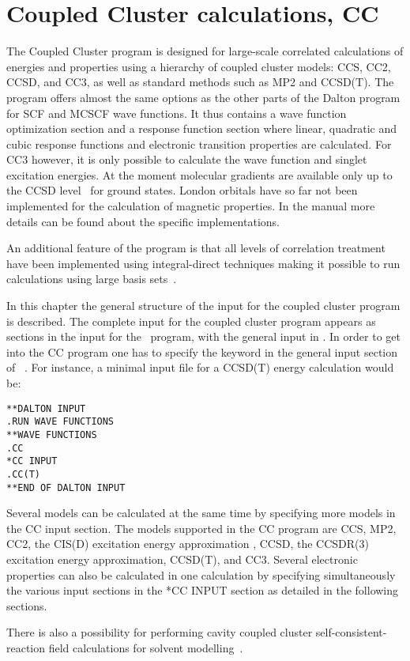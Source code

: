 \chapter{Coupled Cluster calculations, CC}\label{ch:CC}

The Coupled Cluster program {\cc} is designed for large-scale
correlated calculations of energies and properties using a
hierarchy of coupled cluster models: CCS, CC2, CCSD, and CC3, as well as standard methods such as MP2 and CCSD(T).
The program offers almost the same options as the other
parts of the Dalton program for SCF and MCSCF wave functions.
It thus contains a wave function optimization section and 
a response function section
where linear, quadratic and cubic response functions and electronic
transition properties are calculated.
For CC3 however, it is only possible to calculate the wave function and 
singlet excitation energies.
At the moment molecular gradients are available 
only up to the CCSD level~\cite{} for ground states.  
London orbitals have so far not been implemented 
for the calculation of magnetic
properties.
In the manual more details can be found about the specific implementations.

An additional feature of the program is that all levels of correlation
treatment have been implemented using integral-direct techniques making
it possible to run calculations using large basis
sets~\cite{}.

In this chapter the general structure of the input for the
coupled cluster program is described.
The complete input for the coupled cluster program appears as
sections in the input for the \sir\ program, with the general
input in . In order to get into the CC program
one has to specify the  keyword in the general input
section of \sir\ . For instance, a minimal
input file for a CCSD(T) energy calculation would be:
\begin{verbatim}
**DALTON INPUT
.RUN WAVE FUNCTIONS
**WAVE FUNCTIONS
.CC
*CC INPUT
.CC(T)
**END OF DALTON INPUT
\end{verbatim}

Several models can be calculated at the same time by specifying more models
in the CC input section. 
The models supported in the CC program are 
CCS\cite{Christiansen:CPL243},
MP2\cite{Moller34},
CC2\cite{Christiansen:CPL243},
the CIS(D) excitation energy approximation \cite{Head-Gordon:94},
CCSD\cite{Purvis82},
the CCSDR(3) excitation energy approximation\cite{Christiansen:PERTURBATIVE_TRIPLES}, 
CCSD(T)\cite{Raghavachari89}, and CC3\cite{Christiansen:JCP103,Koch:JCP106}.
Several electronic properties can also 
be calculated in one calculation by specifying simultaneously 
the various input sections in the *CC INPUT section
as detailed in the following sections.

There is also a possibility for performing cavity coupled cluster
self-consistent-reaction field calculations for solvent modelling~\cite{}.
